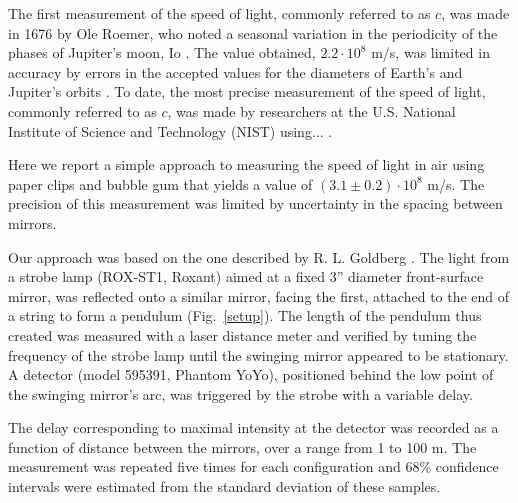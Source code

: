 \documentclass[aps,twocolumn,showpacs,preprintnumbers]{revtex4}
\begin{document}
The first measurement of the speed of light, commonly referred to as $c$, was made in 1676 by Ole Roemer, who noted a seasonal variation in the periodicity of the phases of Jupiter's moon, Io \cite{BobisJAHH}.
The value obtained, $2.2 \cdot 10^8$ m/s, was limited in accuracy by errors in the accepted values for the diameters of Earth's and Jupiter's orbits \cite{refExample1}.
To date, the most precise measurement of the speed of light, commonly referred to as $c$, was made by researchers at the U.S. National Institute of Science and Technology (NIST) using... \cite{refExampleMANY}.


Here we report a simple approach to measuring the speed of light in air using paper clips and bubble gum that yields a value of $(3.1 \pm 0.2) \cdot 10^8$ m/s.  
The precision of this measurement was limited by uncertainty in the spacing between mirrors.

Our approach was based on the one described by R. L. Goldberg \cite{GoldbergBOOK79}.
The light from a strobe lamp (ROX-ST1, Roxant) aimed at a fixed 3'' diameter front-surface mirror, was reflected onto a similar mirror, facing the first, attached to the end of a string to form a pendulum (Fig.~\ref{setup}).
The length of the pendulum thus created was measured with a laser distance meter and verified by tuning the frequency of the strobe lamp until the swinging mirror appeared to be stationary.
A detector (model 595391, Phantom YoYo), positioned behind the low point of the swinging mirror's arc, was triggered by the strobe with a variable delay.

The delay corresponding to maximal intensity at the detector was recorded as a function of distance between the mirrors, over a range from 1 to 100 m.
The measurement was repeated five times for each configuration and 68\% confidence intervals were estimated from the standard deviation of these samples.

\end{document}
